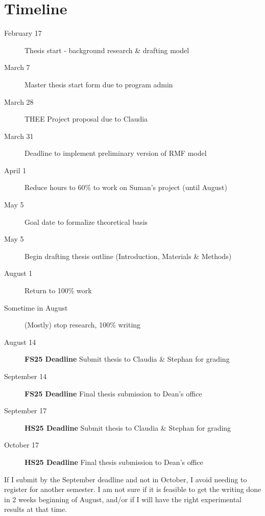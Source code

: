 \documentclass[paper=a4, fontsize=11pt,twoside]{scrartcl}       %
\begin{document}
    \section{Timeline}

        \begin{description}
		
		\item [February 17] Thesis start - background research \& drafting model 
		\item [March 7] Master thesis start form due to program admin
		\item [March 28] THEE Project proposal due to Claudia
		\item [March 31] Deadline to implement preliminary version of RMF model
		\item [April 1] Reduce hours to 60\% to work on Suman's project (until August)
		\item [May 5] Goal date to formalize theoretical basis 
		\item [May 5] Begin drafting thesis outline (Introduction, Materials \& Methods)
		\item [August 1] Return to 100\% work
		\item [Sometime in August] (Mostly) stop research, 100\% writing
		\item [August 14] \textbf{FS25 Deadline} Submit thesis to Claudia \& Stephan for grading
		\item [September 14] \textbf{FS25 Deadline} Final thesis submission to Dean's office
		\item [September 17] \textbf{HS25 Deadline} Submit thesis to Claudia \& Stephan for grading
		\item [October 17] \textbf{HS25 Deadline} Final thesis submission to Dean's office

	\end{description}

	If I submit by the September deadline and not in October, I avoid needing to register for another semester. I am not sure if it is feasible to get the writing done in 2 weeks beginning of August, and/or if I will have the right experimental results at that time.   

	\printbibliography	
\end{document}
